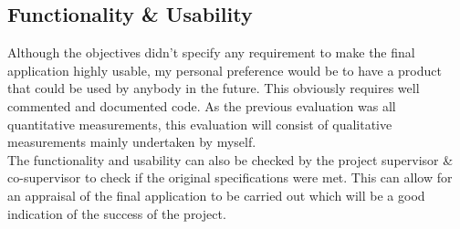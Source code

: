 \documentclass[a4paper, titlepage]{article}
\begin{document}
\subsection{Functionality \& Usability}
Although the objectives didn't specify any requirement to make the final application highly usable, my personal preference would be to have a product that could be used by anybody in the future. This obviously requires well commented and documented code. As the previous evaluation was all quantitative measurements, this evaluation will consist of qualitative measurements mainly undertaken by myself. \\
\newline
The functionality and usability can also be checked by the project supervisor \& co-supervisor to check if the original specifications were met. This can allow for an appraisal of the final application to be carried out which will be a good indication of the success of the project.

\newpage


\begin{thebibliography}{99}
\end{thebibliography}
\end{document}
